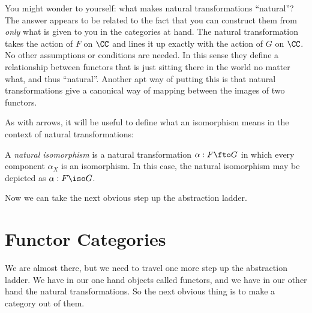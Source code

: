 You might wonder to yourself: what makes natural transformations ``natural''? The answer
appears to be related to the fact that you can construct them from {\it only} what is
given to you in the categories at hand. The natural transformation takes the action of $F$
on $\CC$ and lines it up exactly with the action of $G$ on $\CC$. No other assumptions or
conditions are needed. In this sense they define a relationship between functors that is
just sitting there in the world no matter what, and thus ``natural''. Another apt way of
putting this is that natural transformations give a canonical way of mapping between the
images of two functors.

As with arrows, it will be useful to define what an isomorphism means in the context of
natural transformations:

\begin{defn}
A {\it natural isomorphism} is a natural transformation $\alpha: F \fto G$ in which every
component $\alpha_X$ is an isomorphism. In this case, the natural isomorphism may be
depicted as $\alpha: F \iso G$.
\end{defn}

Now we can take the next obvious step up the abstraction ladder.

\section{Functor Categories}

We are almost there, but we need to travel one more step up the abstraction ladder. We
have in our one hand objects called functors, and we have in our other hand the natural
transformations. So the next obvious thing is to make a category out of them.

